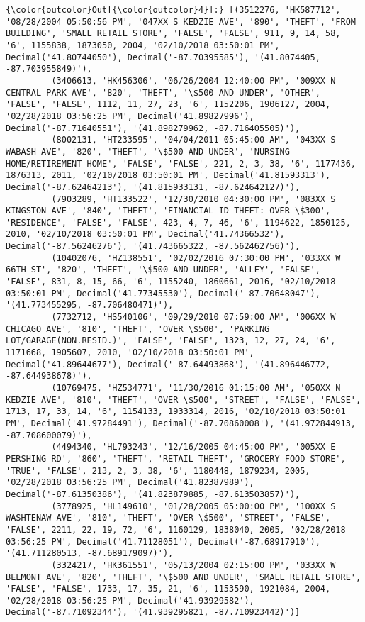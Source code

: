 \documentclass[11pt]{article}
\begin{document}
\begin{Verbatim}[commandchars=\\\{\}]
{\color{outcolor}Out[{\color{outcolor}4}]:} [(3512276, 'HK587712', '08/28/2004 05:50:56 PM', '047XX S KEDZIE AVE', '890', 'THEFT', 'FROM BUILDING', 'SMALL RETAIL STORE', 'FALSE', 'FALSE', 911, 9, 14, 58, '6', 1155838, 1873050, 2004, '02/10/2018 03:50:01 PM', Decimal('41.80744050'), Decimal('-87.70395585'), '(41.8074405, -87.703955849)'),
         (3406613, 'HK456306', '06/26/2004 12:40:00 PM', '009XX N CENTRAL PARK AVE', '820', 'THEFT', '\$500 AND UNDER', 'OTHER', 'FALSE', 'FALSE', 1112, 11, 27, 23, '6', 1152206, 1906127, 2004, '02/28/2018 03:56:25 PM', Decimal('41.89827996'), Decimal('-87.71640551'), '(41.898279962, -87.716405505)'),
         (8002131, 'HT233595', '04/04/2011 05:45:00 AM', '043XX S WABASH AVE', '820', 'THEFT', '\$500 AND UNDER', 'NURSING HOME/RETIREMENT HOME', 'FALSE', 'FALSE', 221, 2, 3, 38, '6', 1177436, 1876313, 2011, '02/10/2018 03:50:01 PM', Decimal('41.81593313'), Decimal('-87.62464213'), '(41.815933131, -87.624642127)'),
         (7903289, 'HT133522', '12/30/2010 04:30:00 PM', '083XX S KINGSTON AVE', '840', 'THEFT', 'FINANCIAL ID THEFT: OVER \$300', 'RESIDENCE', 'FALSE', 'FALSE', 423, 4, 7, 46, '6', 1194622, 1850125, 2010, '02/10/2018 03:50:01 PM', Decimal('41.74366532'), Decimal('-87.56246276'), '(41.743665322, -87.562462756)'),
         (10402076, 'HZ138551', '02/02/2016 07:30:00 PM', '033XX W 66TH ST', '820', 'THEFT', '\$500 AND UNDER', 'ALLEY', 'FALSE', 'FALSE', 831, 8, 15, 66, '6', 1155240, 1860661, 2016, '02/10/2018 03:50:01 PM', Decimal('41.77345530'), Decimal('-87.70648047'), '(41.773455295, -87.706480471)'),
         (7732712, 'HS540106', '09/29/2010 07:59:00 AM', '006XX W CHICAGO AVE', '810', 'THEFT', 'OVER \$500', 'PARKING LOT/GARAGE(NON.RESID.)', 'FALSE', 'FALSE', 1323, 12, 27, 24, '6', 1171668, 1905607, 2010, '02/10/2018 03:50:01 PM', Decimal('41.89644677'), Decimal('-87.64493868'), '(41.896446772, -87.644938678)'),
         (10769475, 'HZ534771', '11/30/2016 01:15:00 AM', '050XX N KEDZIE AVE', '810', 'THEFT', 'OVER \$500', 'STREET', 'FALSE', 'FALSE', 1713, 17, 33, 14, '6', 1154133, 1933314, 2016, '02/10/2018 03:50:01 PM', Decimal('41.97284491'), Decimal('-87.70860008'), '(41.972844913, -87.708600079)'),
         (4494340, 'HL793243', '12/16/2005 04:45:00 PM', '005XX E PERSHING RD', '860', 'THEFT', 'RETAIL THEFT', 'GROCERY FOOD STORE', 'TRUE', 'FALSE', 213, 2, 3, 38, '6', 1180448, 1879234, 2005, '02/28/2018 03:56:25 PM', Decimal('41.82387989'), Decimal('-87.61350386'), '(41.823879885, -87.613503857)'),
         (3778925, 'HL149610', '01/28/2005 05:00:00 PM', '100XX S WASHTENAW AVE', '810', 'THEFT', 'OVER \$500', 'STREET', 'FALSE', 'FALSE', 2211, 22, 19, 72, '6', 1160129, 1838040, 2005, '02/28/2018 03:56:25 PM', Decimal('41.71128051'), Decimal('-87.68917910'), '(41.711280513, -87.689179097)'),
         (3324217, 'HK361551', '05/13/2004 02:15:00 PM', '033XX W BELMONT AVE', '820', 'THEFT', '\$500 AND UNDER', 'SMALL RETAIL STORE', 'FALSE', 'FALSE', 1733, 17, 35, 21, '6', 1153590, 1921084, 2004, '02/28/2018 03:56:25 PM', Decimal('41.93929582'), Decimal('-87.71092344'), '(41.939295821, -87.710923442)')]
\end{Verbatim}
            
\end{document}
